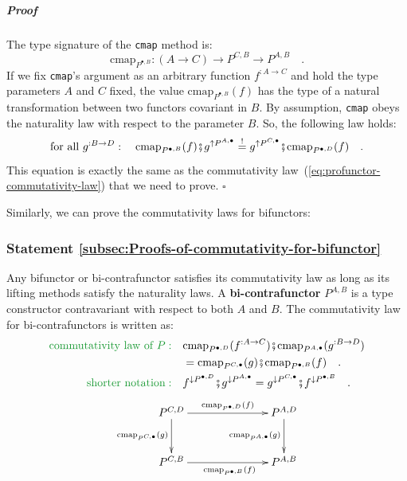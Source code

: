 \subparagraph{Proof}

The type signature of the \lstinline!cmap! method is:
\[
\text{cmap}_{P^{\bullet,B}}:(A\rightarrow C)\rightarrow P^{C,B}\rightarrow P^{A,B}\quad.
\]
If we fix \lstinline!cmap!\textsf{'}s argument as an arbitrary function $f^{:A\rightarrow C}$
and hold the type parameters $A$ and $C$ fixed, the value $\text{cmap}_{P^{\bullet,B}}(f)$
has the type of a natural transformation between two functors covariant
in $B$. By assumption, \lstinline!cmap! obeys the naturality law
with respect to the parameter $B$. So, the following law holds:
\[
\text{for all }g^{:B\rightarrow D}:\quad\text{cmap}_{P^{\bullet,B}}(f)\bef g^{\uparrow P^{A,\bullet}}\overset{!}{=}g^{\uparrow P^{C,\bullet}}\bef\text{cmap}_{P^{\bullet,D}}(f)\quad.
\]
This equation is exactly the same as the commutativity law~(\ref{eq:profunctor-commutativity-law})
that we need to prove. $\square$

Similarly, we can prove the commutativity laws for bifunctors:

\subsubsection{Statement \label{subsec:Proofs-of-commutativity-for-bifunctor}\ref{subsec:Proofs-of-commutativity-for-bifunctor}}

Any bifunctor or bi-contrafunctor satisfies its commutativity law
as long as its lifting methods satisfy the naturality laws. A \textbf{bi-contrafunctor}
$P^{A,B}$ is a type constructor contravariant with respect to both
$A$ and $B$. The commutativity law for bi-contrafunctors is written
as:
\begin{align}
{\color{greenunder}\text{commutativity law of }P:}\quad & \text{cmap}_{P^{\bullet,D}}(f^{:A\rightarrow C})\bef\text{cmap}_{P^{A,\bullet}}(g^{:B\rightarrow D})\nonumber \\
 & =\text{cmap}_{P^{C,\bullet}}(g)\bef\text{cmap}_{P^{\bullet,B}}(f)\quad.\nonumber \\
{\color{greenunder}\text{shorter notation}:}\quad & f^{\downarrow P^{\bullet,D}}\bef g^{\downarrow P^{A,\bullet}}=g^{\downarrow P^{C,\bullet}}\bef f^{\downarrow P^{\bullet,B}}\quad.\label{eq:bi-contrafunctor-commutativity-law}
\end{align}
\[
\xymatrix{\xyScaleY{2.5pc}\xyScaleX{6.0pc}P^{C,D}\ar[r]\sp(0.55){\text{cmap}_{P^{\bullet,D}}(f)~~~}\ar[d]\sb(0.45){\text{cmap}_{P^{C,\bullet}}(g)} & P^{A,D}\ar[d]\sb(0.45){\text{cmap}_{P^{A,\bullet}}(g)}\\
P^{C,B}\ar[r]\sb(0.45){~~~~\text{cmap}_{P^{\bullet,B}}(f)} & P^{A,B}
}
\]


